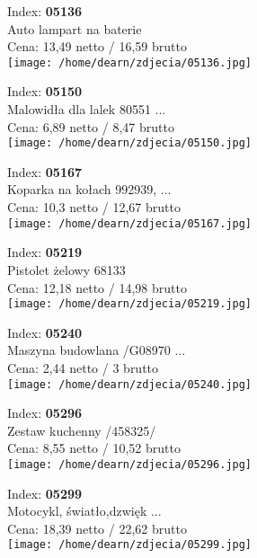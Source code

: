 {Index: \textbf{05136}\\
Auto lampart na baterie\\
Cena: 13,49 netto / 16,59 brutto\\
  \texttt{[image: /home/dearn/zdjecia/05136.jpg]}}\newline\newline

{Index: \textbf{05150}\\
Malowidła dla lalek 80551 ...\\
Cena: 6,89 netto / 8,47 brutto\\
  \texttt{[image: /home/dearn/zdjecia/05150.jpg]}}\newline\newline

{Index: \textbf{05167}\\
Koparka na kołach 992939, ...\\
Cena: 10,3 netto / 12,67 brutto\\
  \texttt{[image: /home/dearn/zdjecia/05167.jpg]}}\newline\newline

{Index: \textbf{05219}\\
Pistolet żelowy 68133\\
Cena: 12,18 netto / 14,98 brutto\\
  \texttt{[image: /home/dearn/zdjecia/05219.jpg]}}\newline\newline

{Index: \textbf{05240}\\
Maszyna budowlana /G08970 ...\\
Cena: 2,44 netto / 3 brutto\\
  \texttt{[image: /home/dearn/zdjecia/05240.jpg]}}\newline\newline

{Index: \textbf{05296}\\
Zestaw kuchenny /458325/\\
Cena: 8,55 netto / 10,52 brutto\\
  \texttt{[image: /home/dearn/zdjecia/05296.jpg]}}\newline\newline

{Index: \textbf{05299}\\
Motocykl, światło,dzwięk  ...\\
Cena: 18,39 netto / 22,62 brutto\\
  \texttt{[image: /home/dearn/zdjecia/05299.jpg]}}\newline\newline

